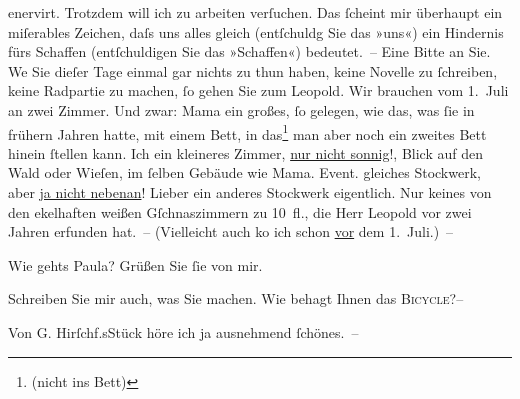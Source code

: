                enervirt. Trotzdem will ich zu arbeiten verſuchen. Das{ }ſcheint mir überhaupt ein
               miſerables Zeichen, daſs uns alles gleich (entſchuldg Sie das »uns«) ein Hindernis
               fürs {\pb}Schaffen (entſchuldigen Sie das »Schaffen«)
               bedeutet. – Eine Bitte an Sie. We{\geminationn} Sie dieſer Tage
               einmal gar nichts zu thun haben, keine Novelle zu{ }ſchreiben, keine Radpartie zu
               machen,{ }ſo gehen Sie zum Leopold. Wir brauchen vom 1. Juli an zwei Zimmer. Und zwar: Mama ein großes,{ }ſo gelegen, wie das, was{ }ſie in frühern
               Jahren hatte, mit einem Bett, in das\footnote{\noindent{}(nicht ins Bett)} man aber noch ein zweites Bett hinein{ }ſtellen kann. Ich ein kleineres Zimmer,
                  \uline{nur nicht sonnig}!, Blick auf den Wald oder Wieſen,
               im{ }ſelben Gebäude wie Mama.
               Event. gleiches Stockwerk, aber \uline{ja nicht nebenan}!
               Lieber ein anderes Stockwerk eigentlich. Nur keines von den ekelhaften weißen
               Gſchnaszimmern zu 10 fl., die Herr Leopold vor
                  {\pb}zwei Jahren erfunden hat. – (Vielleicht auch ko{\geminationm} ich schon \uline{vor} dem
                  1. Juli.) –\pend
           
\pstart
           Wie gehts Paula? Grüßen Sie{ }ſie von mir.\pend
           
\pstart
           Schreiben Sie mir auch, was Sie machen. Wie behagt Ihnen das \textsc{Bicycle}?–\pend
           
\pstart
           Von G. Hirſchf.sStück höre ich ja ausnehmend{ }ſchönes. –\pend
           
